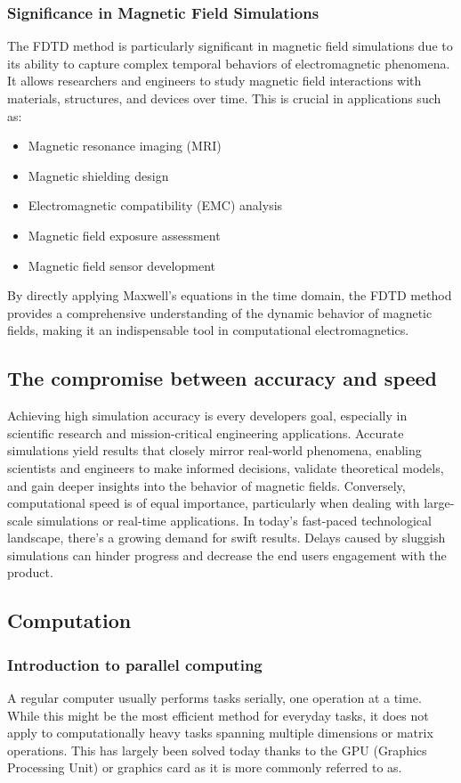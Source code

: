 \documentclass[11pt, a4paper, titlepage]{article}
\begin{document}
\subsubsection{Significance in Magnetic Field Simulations}
The FDTD method is particularly significant in magnetic field simulations due to its ability to capture complex temporal behaviors of electromagnetic phenomena. It allows researchers and engineers to study magnetic field interactions with materials, structures, and devices over time. This is crucial in applications such as:
\begin{itemize}
	\item Magnetic resonance imaging (MRI)
	\item Magnetic shielding design
	\item Electromagnetic compatibility (EMC) analysis
	\item Magnetic field exposure assessment
	\item Magnetic field sensor development
\end{itemize}
By directly applying Maxwell's equations in the time domain, the FDTD method provides a comprehensive understanding of the dynamic behavior of magnetic fields, making it an indispensable tool in computational electromagnetics. 
\subsection{The compromise between accuracy and speed}
Achieving high simulation accuracy is every developers goal, especially in scientific research and mission-critical engineering applications. Accurate simulations yield results that closely mirror real-world phenomena, enabling scientists and engineers to make informed decisions, validate theoretical models, and gain deeper insights into the behavior of magnetic fields. 
Conversely, computational speed is of equal importance, particularly when dealing with large-scale simulations or real-time applications. In today's fast-paced technological landscape, there's a growing demand for swift results. Delays caused by sluggish simulations can hinder progress and decrease the end users engagement with the product. 

\newpage

\subsection{Computation}
\subsubsection{Introduction to parallel computing}
A regular computer usually performs tasks serially, one operation at a time. While this might be the most efficient method for everyday tasks, it does not apply to computationally heavy tasks spanning multiple dimensions or matrix operations. This has largely been solved today thanks to the GPU (Graphics Processing Unit) or graphics card as it is more commonly referred to as.
\end{document}
